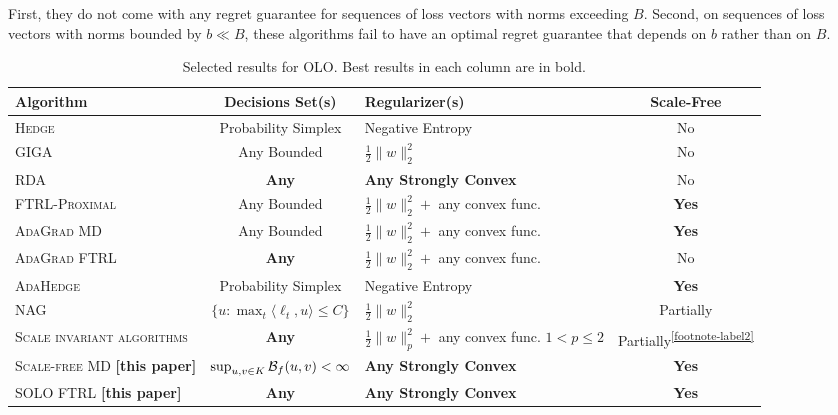 First, they do not come with any regret guarantee for sequences of loss vectors
with norms exceeding $B$. Second, on sequences of loss vectors with norms
bounded by $b \ll B$, these algorithms fail to have an optimal regret guarantee
that depends on $b$ rather than on $B$.

\renewcommand{\arraystretch}{1.8}

\begin{table}[t]
\fontsize{8}{8.2}\selectfont
\centering
\begin{tabular}{|p{3.6cm}|c|p{3.4cm}|c|}
\hline
\textbf{Algorithm} & \textbf{Decisions Set(s)} & \textbf{Regularizer(s)} & \textbf{Scale-Free} \\ \hline \hline
\textsc{Hedge} \cite{Freund-Schapire-1997} & Probability Simplex & Negative Entropy & No \\ \hline
\textsc{GIGA} \cite{Zinkevich-2003} & Any Bounded & $\frac{1}{2}\|w\|_2^2$ & No \\ \hline
\textsc{RDA} \cite{Xiao-2010} & \textbf{Any} & \textbf{Any Strongly Convex} & No \\ \hline
\textsc{FTRL-Proximal} \cite{McMahan-Streeter-2010,McMahan-2014} & Any Bounded & $\frac{1}{2}\|w\|_2^2 + $ any convex func.\footnotemark & \textbf{Yes} \\ \hline
\textsc{AdaGrad MD} \cite{Duchi-Hazan-Singer-2011} & Any Bounded & $\frac{1}{2}\|w\|_2^2 + $ any convex func. & \textbf{Yes} \\ \hline
\textsc{AdaGrad FTRL} \cite{Duchi-Hazan-Singer-2011} & \textbf{Any} & $\frac{1}{2}\|w\|_2^2 + $ any convex func. & No \\ \hline
\textsc{AdaHedge} \cite{de-Rooij-van-Erven-Grunwald-Koolen-2014} & Probability Simplex & Negative Entropy & \textbf{Yes} \\ \hline
\textsc{NAG} \cite{Ross-Mineiro-Langford-2013} & $\{u: \max_t \langle \ell_t, u\rangle \le C\}$ & $\frac{1}{2}\|w\|_2^2 $& Partially\footnotemark \\ \hline
\textsc{Scale invariant algorithms} \cite{Orabona-Crammer-Cesa-Bianchi-2014} & \textbf{Any} & $\frac{1}{2}\|w\|_p^2 + $ any convex func. \newline $1 < p \le 2$ & Partially\textsuperscript{\ref{footnote-label2}} \\ \hline
\textsc{Scale-free MD} \textbf{[this paper]} & $\sup_{u,v \in K} \mathcal{B}_f(u,v) < \infty$ & \textbf{Any Strongly Convex} & \textbf{Yes} \\ \hline
\textsc{SOLO FTRL} \textbf{[this paper]} & \textbf{Any} & \textbf{Any Strongly Convex} & \textbf{Yes} \\ \hline
\end{tabular}
\caption{Selected results for OLO. Best results in each column are in bold.
\label{table:results}
}
\end{table}

